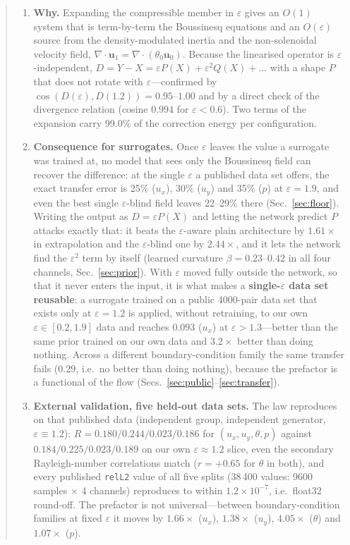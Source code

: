 \documentclass[11pt,a4paper]{article}
\begin{document}
\begin{abstract}
\begin{enumerate}
\item \textbf{Why.} Expanding the compressible member in $\varepsilon$ gives an $O(1)$ system that is
term-by-term the Boussinesq equations and an $O(\varepsilon)$ source from the density-modulated
inertia and the non-solenoidal velocity field, $\nabla\cdot\bm{u}_1=\nabla\cdot(\theta_0\bm{u}_0)$.
Because the linearised operator is $\varepsilon$-independent,
$D=Y-X=\varepsilon P(X)+\varepsilon^2Q(X)+\dots$ with a shape $P$ that does not rotate with
$\varepsilon$---confirmed by $\cos(D(\varepsilon),D(1.2))=0.95$--$1.00$ and by a direct check of the
divergence relation (cosine $0.994$ for $\varepsilon<0.6$). Two terms of the expansion carry
99.0\% of the correction energy per configuration.

\item \textbf{Consequence for surrogates.} Once $\varepsilon$ leaves the value a surrogate was trained
at, no model that sees only the Boussinesq field can recover the difference: at the single
$\varepsilon$ a published data set offers, the exact transfer error is 25\% ($u_x$), 30\% ($u_y$) and
35\% ($p$) at $\varepsilon=1.9$, and even the best single $\varepsilon$-blind field leaves 22--29\%
there (Sec.~\ref{sec:floor}). Writing the output as $D=\varepsilon P(X)$ and letting the network
predict $P$ attacks exactly that: it beats the $\varepsilon$-aware plain architecture by $1.61\times$
in extrapolation and the $\varepsilon$-blind one by $2.44\times$, and it lets the network find the
$\varepsilon^2$ term by itself (learned curvature $\beta=0.23$--$0.42$ in all four channels,
Sec.~\ref{sec:prior}). With $\varepsilon$ moved fully outside the network, so that it never enters
the input, it is what makes a \textbf{single-$\varepsilon$ data set reusable}: a surrogate trained on
a public 4000-pair data set that exists only at $\varepsilon=1.2$ is applied, without retraining,
to our own $\varepsilon\in[0.2,1.9]$ data and reaches $0.093$ ($u_x$) at $\varepsilon>1.3$---better
than the same prior trained on our own data and $3.2\times$ better than doing nothing. Across a
different boundary-condition family the same transfer fails ($0.29$, i.e.\ no better than doing
nothing), because the prefactor is a functional of the flow (Secs.~\ref{sec:public}--\ref{sec:transfer}).

\item \textbf{External validation, five held-out data sets.} The law reproduces on that published data
(independent group, independent generator, $\varepsilon\equiv1.2$): $R=0.180/0.244/0.023/0.186$ for
$(u_x,u_y,\theta,p)$ against $0.184/0.225/0.023/0.189$ on our own $\varepsilon\approx1.2$ slice,
even the secondary Rayleigh-number correlations match ($r=+0.65$ for $\theta$ in both), and every
published \texttt{relL2} value of all five splits (38\,400 values: 9600 samples $\times$ 4 channels)
reproduces to within $1.2\times10^{-7}$, i.e.\ float32 round-off. The prefactor is not universal---between
boundary-condition families at fixed $\varepsilon$ it moves by $1.66\times$ ($u_x$), $1.38\times$
($u_y$), $4.05\times$ ($\theta$) and $1.07\times$ ($p$).
\end{enumerate}


\end{abstract}
\end{document}
